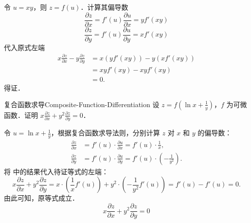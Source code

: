 \begin{myproof}
    令 $u = xy$，则 $z = f(u)$．计算其偏导数
    \begin{equation}
        \frac{\partial z}{\partial x} = f'(u) \frac{\partial u}{\partial x} = y f'(xy)
    \end{equation}
    \begin{equation}
        \frac{\partial z}{\partial y} = f'(u) \frac{\partial u}{\partial y} = x f'(xy)
    \end{equation}
    代入原式左端
    \begin{equation}
        \begin{aligned}
            x \frac{\partial z}{\partial x} - y \frac{\partial z}{\partial y} & = x (y f'(xy)) - y (x f'(xy)) \\
                                                                              & = xy f'(xy) - xy f'(xy)       \\
                                                                              & = 0.
        \end{aligned}
    \end{equation}
    得证．
\end{myproof}


\begin{problem}{复合函数求导}{Composite-Function-Differentiation}
    设 $z = f\left(\ln x + \frac{1}{y}\right)$，$f$ 为可微函数．证明 $x \frac{\partial z}{\partial x} + y^2 \frac{\partial z}{\partial y} = 0$．
\end{problem}

\begin{myproof}
    令 $u = \ln x + \frac{1}{y}$，根据复合函数求导法则，分别计算 $z$ 对 $x$ 和 $y$ 的偏导数：
    \begin{equation} \label{eq:z-partial}
        \begin{aligned}
            \frac{\partial z}{\partial x} & = f'(u) \cdot \frac{\partial u}{\partial x} = f'(u) \cdot \frac{1}{x},                   \\
            \frac{\partial z}{\partial y} & = f'(u) \cdot \frac{\partial u}{\partial y} = f'(u) \cdot \left( -\frac{1}{y^2} \right).
        \end{aligned}
    \end{equation}
    将  中的结果代入待证等式的左端：
    \begin{equation}
        x \frac{\partial z}{\partial x} + y^2 \frac{\partial z}{\partial y} = x \cdot \left( \frac{1}{x} f'(u) \right) + y^2 \cdot \left( -\frac{1}{y^2} f'(u) \right) = f'(u) - f'(u) = 0.
    \end{equation}
    由此可知，原等式成立．
    \begin{equation}
        \boxed{x \frac{\partial z}{\partial x} + y^2 \frac{\partial z}{\partial y} = 0}
    \end{equation}
\end{myproof}


